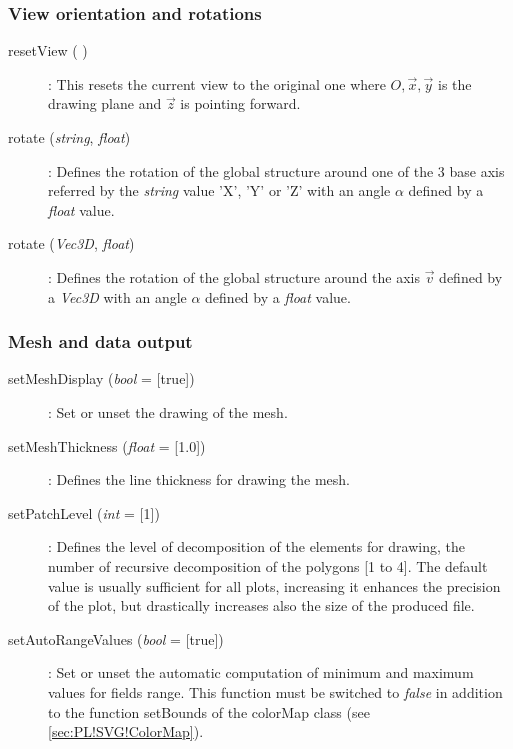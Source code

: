 \subsubsection{View orientation and rotations}
\begin{description}
\item [{resetView ( )}] : This resets the current view to the original one where $O,\overrightarrow{x},\overrightarrow{y}$ is the drawing plane and $\overrightarrow{z}$ is pointing forward.
\item [{rotate (\emph{string}, \emph{float})}] : Defines the rotation of the global structure around one of the $3$ base axis referred by the \emph{string} value 'X', 'Y' or 'Z' with an angle $\alpha$ defined by a \emph{float} value.
\item [{rotate (\emph{Vec3D}, \emph{float})}] : Defines the rotation of the global structure around the axis $\overrightarrow{v}$ defined by a \emph{Vec3D} with an angle $\alpha$ defined by a \emph{float} value.
\end{description}

\subsubsection{Mesh and data output}
\begin{description}
\item [{setMeshDisplay (\emph{bool} = [true])}] : Set or unset the drawing of the mesh.
\item [{setMeshThickness (\emph{float} = [1.0])}] : Defines the line thickness for drawing the mesh.
\item [{setPatchLevel (\emph{int} = [1])}] : Defines the level of decomposition of the elements for drawing, \ie the number of recursive decomposition of the polygons [1 to 4]. The default value is usually sufficient for all plots, increasing it enhances the precision of the plot, but drastically increases also the size of the produced file.
\item [{setAutoRangeValues (\emph{bool} = [true])}] : Set or unset the automatic computation of minimum and maximum values for fields range. This function must be switched to \emph{false} in addition to the function \textsf{setBounds} of the \textsf{colorMap} class (see \ref{sec:PL!SVG!ColorMap}).
\end{description}

